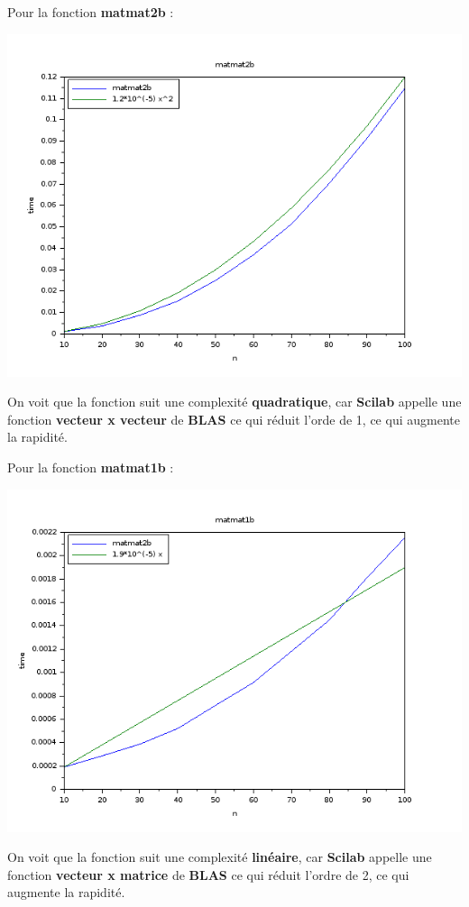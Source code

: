 \documentclass[12pt, letterpaper]{article}
\begin{document}
Pour la fonction \textbf{matmat2b} :

\includegraphics[scale=0.5]{img/matmat2b.png}

On voit que la fonction suit une complexité \textbf{quadratique}, car
\textbf{Scilab} appelle une fonction \textbf{vecteur x vecteur} de
\textbf{BLAS} ce qui réduit l'orde de 1, ce qui augmente la
rapidité. \newline

Pour la fonction \textbf{matmat1b} :

\includegraphics[scale=0.5]{img/matmat1b.png}

On voit que la fonction suit une complexité \textbf{linéaire}, car
\textbf{Scilab} appelle une fonction \textbf{vecteur x matrice} de
\textbf{BLAS} ce qui réduit l'ordre de 2, ce qui augmente la
rapidité. \newline
\end{document}
